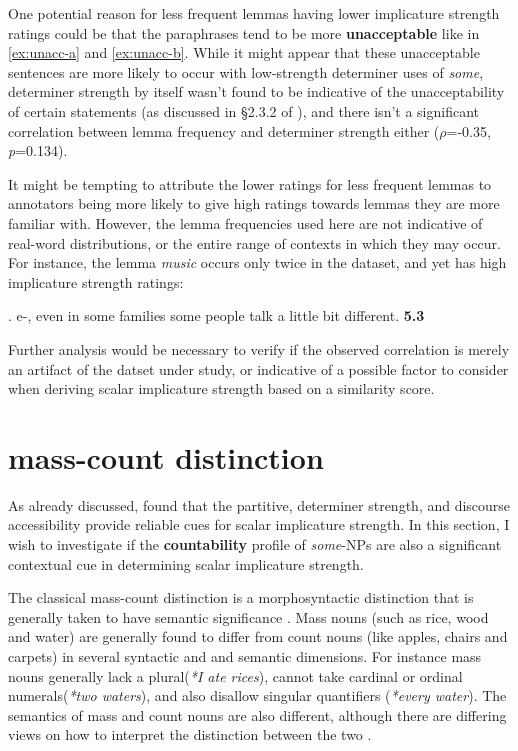 \documentclass[10pt, biblatex, linguex]{report}
\begin{document}
One potential reason for less frequent lemmas
having lower implicature strength ratings could be that the paraphrases tend to be
more \textbf{unacceptable} like in \ref{ex:unacc-a} and \ref{ex:unacc-b}. While it might
appear that these unacceptable sentences are more likely to occur with
low-strength determiner uses of \textit{some}, determiner
strength by itself wasn't found to be indicative of the unacceptability of
certain statements (as discussed in \S 2.3.2 of \citet{degen_investigating_2015}
), and there isn't a significant correlation between lemma frequency and
determiner strength either ($\rho$=-0.35, \textit{p}=0.134).

It might be tempting to attribute the lower ratings for less frequent lemmas to
annotators being more likely to give high ratings towards lemmas
they are more familiar with. However, the
lemma frequencies used here are not indicative of real-word distributions, or the
entire range of contexts in which they may occur. For instance, the lemma
\textit{music} occurs only twice in the dataset, and yet has high
implicature strength ratings:

\ex. e-, even in some families some people talk a little bit different. \hfill \textbf{5.3}

Further analysis would be necessary to verify if the observed correlation is
merely an artifact of the datset under study, or indicative of a possible
factor to consider when deriving scalar implicature strength based on a
similarity score.

\section{mass-count distinction}
\label{sec:masscount}

As already discussed, \citet{degen_investigating_2015} found that the
partitive, determiner strength, and discourse accessibility provide reliable cues
for scalar implicature strength. In this section, I wish to investigate if the
\textbf{countability} profile of \textit{some}-NPs are also a significant
contextual cue in determining scalar implicature strength.

The classical mass-count distinction is a morphosyntactic distinction that is
generally taken to have semantic significance \citep{moltmann2020}. Mass nouns
(such as rice, wood and water) are generally found to differ from count nouns
(like apples, chairs and carpets) in several syntactic and and semantic
dimensions. For instance mass nouns generally lack a plural(\textit{*I ate rices}),
cannot take cardinal or ordinal numerals(\textit{*two waters}), and also disallow
singular quantifiers (\textit{*every water}). The semantics of mass and count nouns
are also different, although there are differing views on how to interpret the
distinction between the two \citep{moltmann1998part,moltmann1998part,
link2002logical,champollion2016mereology,champollion2017parts,krifka1989nominal,
moltmann2020}.
\end{document}
